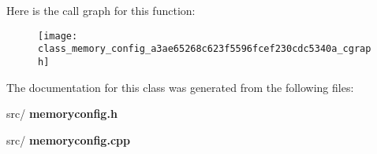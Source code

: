 Here is the call graph for this function\+:\nopagebreak
\begin{figure}[H]
\begin{center}
\leavevmode
\texttt{[image: class\_memory\_config\_a3ae65268c623f5596fcef230cdc5340a\_cgraph]}
\end{center}
\end{figure}


The documentation for this class was generated from the following files\+:\begin{DoxyCompactItemize}
\item 
src/\textbf{ memoryconfig.\+h}\item 
src/\textbf{ memoryconfig.\+cpp}\end{DoxyCompactItemize}
